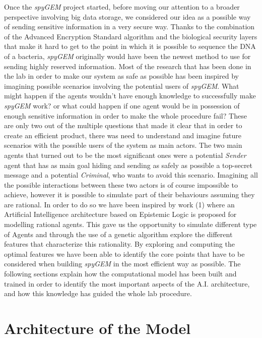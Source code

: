 \documentclass[a4paper]{article}
\begin{document}
Once the \textit{spyGEM} project started, before moving our attention to a broader perspective involving big data storage, we considered our idea as a possible way of sending sensitive information in a very secure way. Thanks to the combination of the Advanced Encryption Standard algorithm and the biological security layers that make it hard to get to the point in which it is possible to sequence the DNA of a bacteria, \textit{spyGEM} originally would have been the newest method to use for sending highly reserved information. Most of the research that has been done in the lab in order to make our system as safe as possible has been inspired by imagining possible scenarios involving the potential users of \textit{spyGEM}. What might happen if the agents wouldn't have enough knowledge to successfully make \textit{spyGEM} work? or what could happen if one agent would be in possession of enough sensitive information in order to make the whole procedure fail? These are only two out of the multiple questions that made it clear that in order to create an efficient product, there was need to understand and imagine future scenarios with the possible users of the system as main actors. The two main agents that turned out to be the most significant ones were a potential \textit{Sender} agent that has as main goal hiding and sending as safely as possible a top-secret message and a potential \textit{Criminal}, who wants to avoid this scenario. Imagining all the possible interactions between these two actors is of course impossible to achieve, however it is possible to simulate part of their behaviours assuming they are rational. In order to do so we have been inspired by work (1) where an Artificial Intelligence architecture based on Epistemic Logic is proposed for modelling rational agents. This gave us the opportunity to simulate different type of Agents and through the use of a genetic algorithm explore the different features that characterize this rationality. By exploring and computing the optimal features we have been able to identify the core points that have to be considered when building \textit{spyGEM} in the most efficient way as possible. The following sections explain how the computational model has been built and trained in order to identify the most important aspects of the A.I. architecture, and how this knowledge has guided the whole lab procedure.   
 
\section{Architecture of the Model}
\end{document}
